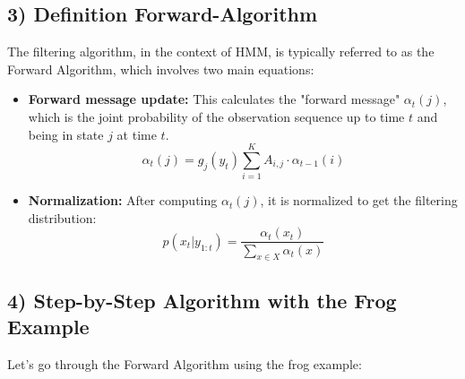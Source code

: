 \documentclass[10pt]{article}
\begin{document}
\subsection*{3) Definition Forward-Algorithm}
The filtering algorithm, in the context of HMM, is typically referred to as the Forward Algorithm, which involves two main equations:

\begin{itemize}
  \item \textbf{Forward message update:} This calculates the "forward message" \( \alpha_t(j) \), which is the joint probability of the observation sequence up to time \( t \) and being in state \( j \) at time \( t \).
\[ \alpha_t(j) = g_j(y_t) \sum_{i=1}^{K} A_{i,j} \cdot \alpha_{t-1}(i) \]

  \item \textbf{Normalization:} After computing \( \alpha_t(j) \), it is normalized to get the filtering distribution:
\[ p(x_t | y_{1:t}) = \frac{\alpha_t(x_t)}{\sum_{x \in X} \alpha_t(x)} \]

\end{itemize}

\subsection*{4) Step-by-Step Algorithm with the Frog Example}
Let's go through the Forward Algorithm using the frog example:
\end{document}
